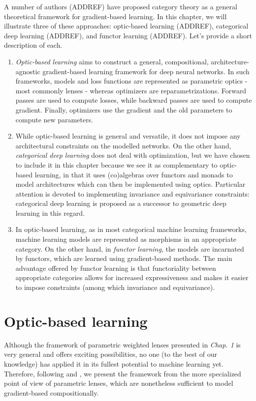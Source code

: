 \documentclass[12pt,a4paper,openright,twoside]{report}
\theoremstyle{plain}
\theoremstyle{definition}
\begin{document}
A number of authors (ADDREF) have proposed category theory as a general theoretical framework for gradient-based learning. In this chapter, we will illustrate three of these approaches: optic-based learning (ADDREF), categorical deep learning (ADDREF), and functor learning (ADDREF). Let's provide a short description of each.
\begin{enumerate}
  \item \textit{Optic-based learning} aims to construct a general, compositional, architecture-agnostic gradient-based learning framework for deep neural networks. In such frameworks, models and loss functions are represented as parametric optics -  most commonly lenses - whereas optimizers are reparametrizations. Forward passes are used to compute losses, while backward passes are used to compute gradient. Finally, optimizers use the gradient and the old parameters to compute new parameters.
  \item While optic-based learning is general and versatile, it does not impose any architectural constraints on the modelled networks. On the other hand, \textit{categorical deep learning} does not deal with optimization, but we have chosen to include it in this chapter because we see it as complementary to optic-based learning, in that it uses (co)algebras over functors and monads to model architectures which can then be implemented using optics. Particular attention is devoted to implementing invariance and equivariance constraints: categorical deep learning is proposed as a successor to geometric deep learning in this regard.
  \item In optic-based learning, as in most categorical machine learning frameworks, machine learning models are represented as morphisms in an appropriate category. On the other hand, in \textit{functor learning}, the models are incarnated by functors, which are learned using gradient-based methods. The main advantage offered by functor learning is that functoriality between appropriate categories allows for increased expressiveness and makes it easier to impose constraints (among which invariance and equivariance). 
\end{enumerate}

\section{Optic-based learning}
\label{sec: opticbasedlearning}

Although the framework of parametric weighted lenses presented in \textit{Chap. 1} is very general and offers exciting possibilities, no one (to the best of our knowledge) has applied it in its fullest potential to machine learning yet. Therefore, following \cite{gavranovic2024fundamental} and \cite{cruttwell2022categorical}, we present the framework from the more specialized point of view of parametric lenses, which are nonetheless sufficient to model gradient-based compositionally.
\end{document}
